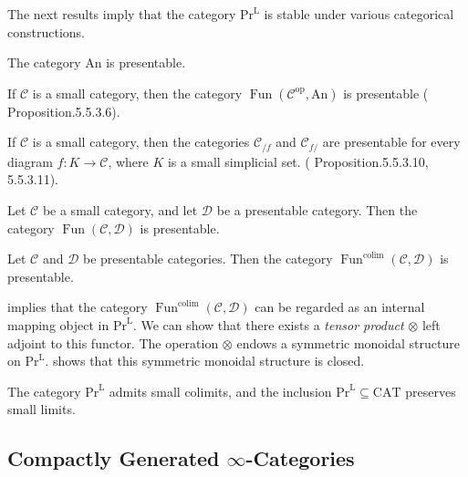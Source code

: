 \documentclass[a4paper,dvipdfmx,11pt,reqno]{amsart}
\DeclareMathOperator{\myop}{op}
\DeclareMathOperator*{\colim}{colim}
\DeclareMathOperator{\Fun}{Fun}
\newcommand{\C}{\mathcal{C}}
\newcommand{\D}{\mathcal{D}}
\newcommand{\An}{\mathrm{An}}
\newcommand{\CAT}{\mathrm{CAT}}
\newcommand{\PrL}{\mathrm{Pr}^{\mathrm{L}}}
\begin{document}
The next results imply that the category $\PrL$ is stable under various categorical constructions.

\begin{example}
  The category $\An$ is presentable.

  If $\C$ is a small category, then the category $\Fun(\C^{\myop},\An)$ is presentable (\cite{HTT} Proposition.5.5.3.6).

  If $\C$ is a small category, then the categories $\C_{/f}$ and $\C_{f/}$ are presentable for every diagram $f : K \to \C$, where $K$ is a small simplicial set. (\cite{HTT} Proposition.5.5.3.10, 5.5.3.11).
\end{example}

\begin{proposition} \label{HTT.5.5.3.6}
  Let $\C$ be a small category, and let $\D$ be a presentable category.
  Then the category $\Fun(\C,\D)$ is presentable.
\end{proposition}

\begin{proposition} \label{HTT.5.5.3.8}
  Let $\C$ and $\D$ be presentable categories.
  Then the category $\Fun^{\colim}(\C,\D)$ is presentable.
\end{proposition}

 implies that the category $\Fun^{\colim}(\C,\D)$ can be regarded as an internal mapping object in $\PrL$.
We can show that there exists a \textit{tensor product} $\otimes$ left adjoint to this functor.
The operation $\otimes$ endows a symmetric monoidal structure on $\PrL$.
 shows that this symmetric monoidal structure is closed.


\begin{proposition} \label{HTT.5.5.3.13}
  The category $\PrL$ admits small colimits, and the inclusion $\PrL \subseteq \CAT$ preserves small limits.
\end{proposition}

\subsection{Compactly Generated \texorpdfstring{$\infty$}{infty}-Categories}
\end{document}
